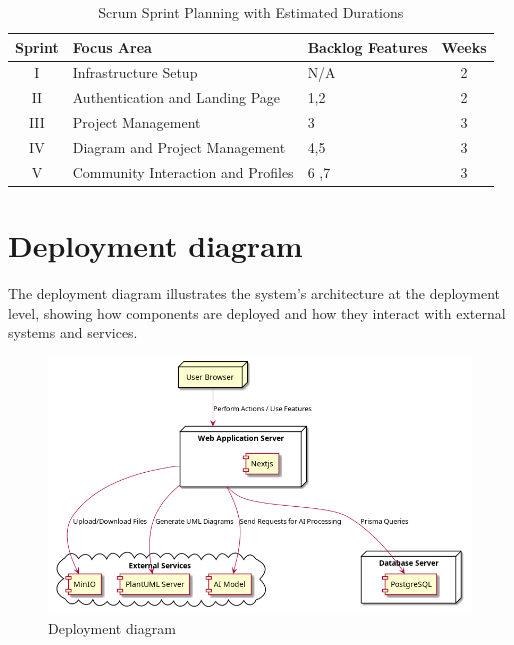 \begin{table}[h!]
    \centering
    \begin{tabular}{|c|l|l|c|}
        \hline
        \textbf{Sprint} & \textbf{Focus Area}                                & \textbf{Backlog Features}                                   & \textbf{Weeks} \\ \hline
        I              & Infrastructure Setup                               & N/A                                                     & 2                                   \\ \hline
        II             & Authentication and Landing Page                    & 1,2                              & 2                                   \\ \hline
        III            & Project Management                                 & 3                            & 3                                   \\ \hline
        IV             & Diagram and Project Management                     & 4,5                            & 3                                   \\ \hline
        V              & Community Interaction and Profiles                 & 6 ,7                          & 3                                   \\ \hline
    \end{tabular}
    \caption{Scrum Sprint Planning with Estimated Durations}
\end{table}

\section{Deployment diagram}

The deployment diagram illustrates the system's architecture at the deployment level, showing how components are deployed and how they interact with external systems and services.

\begin{figure}[H]
    \centering
    \includegraphics[width=\textwidth]{./conception/deployement_diagram.png}
    \caption{Deployment diagram}
    \label{fig:deployment}
\end{figure}

